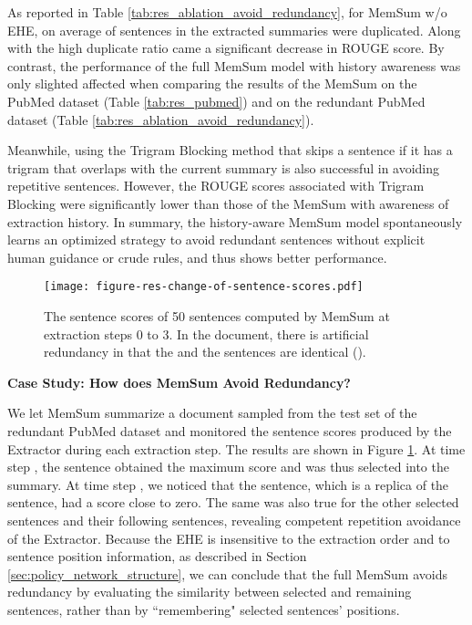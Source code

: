 \documentclass[11pt]{article}
\begin{document}
As reported in Table \ref{tab:res_ablation_avoid_redundancy}, for  MemSum w/o EHE, on average  of sentences in the extracted summaries were duplicated. Along with the high duplicate ratio came a significant decrease in ROUGE score. By contrast, the performance of the full MemSum model with history awareness was only slighted affected when comparing the results of the MemSum on the PubMed dataset (Table \ref{tab:res_pubmed}) and on the redundant PubMed dataset (Table \ref{tab:res_ablation_avoid_redundancy}).

Meanwhile, using the Trigram Blocking method that skips a sentence if it has a trigram that overlaps with the current summary \cite{liu2019text} is also successful in avoiding repetitive sentences. However, the ROUGE scores associated with Trigram Blocking were significantly lower than those of the  MemSum with awareness of extraction history. In summary, the history-aware MemSum model spontaneously learns an optimized strategy to avoid redundant sentences without explicit human guidance or crude rules, and thus shows better performance.

\begin{figure}
\centering
  \texttt{[image: figure-res-change-of-sentence-scores.pdf]}
  \caption{The sentence scores of 50 sentences computed by MemSum at extraction steps 0 to 3. In the document, there is artificial redundancy in that the  and the  sentences are identical (). }
  \label{fig:score_change}
\end{figure}

\noindent\textbf{Case Study: How does MemSum Avoid Redundancy?} 

We let MemSum summarize a document sampled from the test set of the redundant PubMed dataset and monitored the sentence scores produced by the Extractor during each extraction step. The results are shown in Figure \ref{fig:score_change}. At time step , the  sentence obtained the maximum score and was thus selected into the summary. At time step , we noticed that the  sentence, which is a replica of the  sentence, had a score close to zero. The same was also true for the other selected sentences and their following sentences, revealing competent repetition avoidance of the Extractor. 
Because the EHE is insensitive to the extraction order and to sentence position information, as described in Section \ref{sec:policy_network_structure}, we can conclude that the full MemSum avoids redundancy by evaluating the similarity between selected and remaining sentences, rather than by ``remembering" selected sentences' positions.
\end{document}
